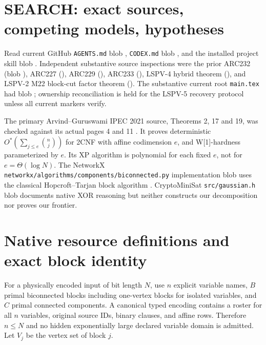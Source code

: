 \documentclass[10pt]{article}
\begin{document}
\section{SEARCH: exact sources, competing models, hypotheses}
Read current GitHub \texttt{AGENTS.md} blob \texttt{}, \texttt{CODEX.md} blob \texttt{}, and the installed project skill blob \texttt{}. Independent substantive source inspections were the prior ARC232 (blob \texttt{}), ARC227 (\texttt{}), ARC229 (\texttt{}), ARC233 (\texttt{}), LSPV-4 hybrid theorem (\texttt{}), and LSPV-2 M22 block-cut factor theorem (\texttt{}). The substantive current root \texttt{main.tex} had blob \texttt{}; ownership reconciliation is held for the LSPV-5 recovery protocol unless all current markers verify.

The primary Arvind--Guruswami IPEC 2021 source, Theorems 2, 17 and 19, was checked against its actual pages 4 and 11 \cite{AG2021}. It proves deterministic $O^*(\sum_{j\le e}\binom nj)$ for 2CNF with affine codimension $e$, and W[1]-hardness parameterized by $e$. Its XP algorithm is polynomial for each fixed $e$, not for $e=\Theta(\log N)$. The NetworkX \texttt{networkx/algorithms/components/biconnected.py} implementation blob \texttt{} uses the classical Hopcroft--Tarjan block algorithm \cite{HT1973}. CryptoMiniSat \texttt{src/gaussian.h} blob \texttt{} documents native XOR reasoning but neither constructs our decomposition nor proves our frontier.

\section{Native resource definitions and exact block identity}
For a physically encoded input of bit length $N$, use $n$ explicit variable names, $B$ primal biconnected blocks including one-vertex blocks for isolated variables, and $C$ primal connected components. A canonical typed encoding contains a roster for all $n$ variables, original source IDs, binary clauses, and affine rows. Therefore $n\le N$ and no hidden exponentially large declared variable domain is admitted. Let $V_j$ be the vertex set of block $j$.
\end{document}
